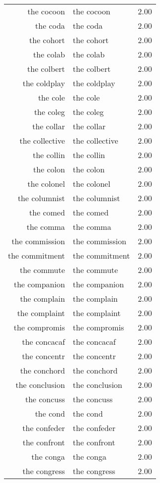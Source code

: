\begin{table}[ht]
\begin{tabular}{rlr}
  the cocoon & the cocoon & 2.00 \\ 
  the coda & the coda & 2.00 \\ 
  the cohort & the cohort & 2.00 \\ 
  the colab & the colab & 2.00 \\ 
  the colbert & the colbert & 2.00 \\ 
  the coldplay & the coldplay & 2.00 \\ 
  the cole & the cole & 2.00 \\ 
  the coleg & the coleg & 2.00 \\ 
  the collar & the collar & 2.00 \\ 
  the collective & the collective & 2.00 \\ 
  the collin & the collin & 2.00 \\ 
  the colon & the colon & 2.00 \\ 
  the colonel & the colonel & 2.00 \\ 
  the columnist & the columnist & 2.00 \\ 
  the comed & the comed & 2.00 \\ 
  the comma & the comma & 2.00 \\ 
  the commission & the commission & 2.00 \\ 
  the commitment & the commitment & 2.00 \\ 
  the commute & the commute & 2.00 \\ 
  the companion & the companion & 2.00 \\ 
  the complain & the complain & 2.00 \\ 
  the complaint & the complaint & 2.00 \\ 
  the compromis & the compromis & 2.00 \\ 
  the concacaf & the concacaf & 2.00 \\ 
  the concentr & the concentr & 2.00 \\ 
  the conchord & the conchord & 2.00 \\ 
  the conclusion & the conclusion & 2.00 \\ 
  the concuss & the concuss & 2.00 \\ 
  the cond & the cond & 2.00 \\ 
  the confeder & the confeder & 2.00 \\ 
  the confront & the confront & 2.00 \\ 
  the conga & the conga & 2.00 \\ 
  the congress & the congress & 2.00 \\ 

\end{tabular}
\end{table}
